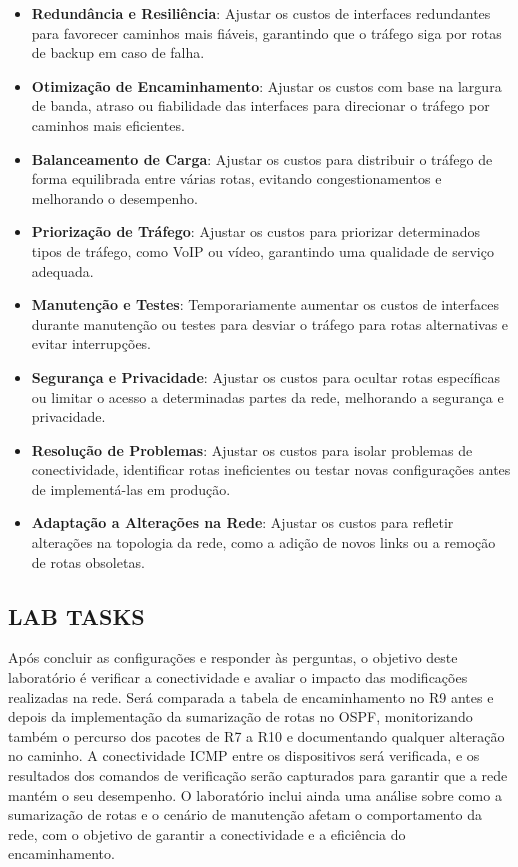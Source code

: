 \documentclass[11pt,english, openright, oneside]{book}
\begin{document}
\begin{enumerate}
  \begin{itemize}
    \item \textbf{Redundância e Resiliência}: Ajustar os custos de interfaces redundantes para favorecer caminhos mais fiáveis, garantindo que o tráfego siga por rotas de backup em caso de falha.
    \item \textbf{Otimização de Encaminhamento}: Ajustar os custos com base na largura de banda, atraso ou fiabilidade das interfaces para direcionar o tráfego por caminhos mais eficientes.
    \item \textbf{Balanceamento de Carga}: Ajustar os custos para distribuir o tráfego de forma equilibrada entre várias rotas, evitando congestionamentos e melhorando o desempenho.
    \item \textbf{Priorização de Tráfego}: Ajustar os custos para priorizar determinados tipos de tráfego, como VoIP ou vídeo, garantindo uma qualidade de serviço adequada.
    \item \textbf{Manutenção e Testes}: Temporariamente aumentar os custos de interfaces durante manutenção ou testes para desviar o tráfego para rotas alternativas e evitar interrupções.
    \item \textbf{Segurança e Privacidade}: Ajustar os custos para ocultar rotas específicas ou limitar o acesso a determinadas partes da rede, melhorando a segurança e privacidade.
    \item \textbf{Resolução de Problemas}: Ajustar os custos para isolar problemas de conectividade, identificar rotas ineficientes ou testar novas configurações antes de implementá-las em produção.
    \item \textbf{Adaptação a Alterações na Rede}: Ajustar os custos para refletir alterações na topologia da rede, como a adição de novos links ou a remoção de rotas obsoletas.
  \end{itemize}
\end{enumerate}
\vspace{0.2cm}

\subsection{LAB TASKS}
\vspace{0.2cm}

\par Após concluir as configurações e responder às perguntas, o objetivo deste laboratório é verificar a conectividade e avaliar o impacto das modificações realizadas na rede. Será comparada a tabela de encaminhamento no R9 antes e depois da implementação da sumarização de rotas no OSPF, monitorizando também o percurso dos pacotes de R7 a R10 e documentando qualquer alteração no caminho. A conectividade ICMP entre os dispositivos será verificada, e os resultados dos comandos de verificação serão capturados para garantir que a rede mantém o seu desempenho. O laboratório inclui ainda uma análise sobre como a sumarização de rotas e o cenário de manutenção afetam o comportamento da rede, com o objetivo de garantir a conectividade e a eficiência do encaminhamento.
\vspace{0.2cm}
\end{document}

